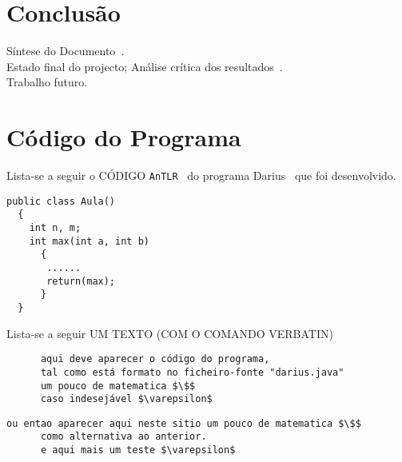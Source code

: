 \documentclass[11pt,a4paper]{report}%
\def\darius{\textsf{Darius}\xspace}
\def\antlr{\texttt{AnTLR}\xspace}
\begin{document}

\chapter{Conclusão} \label{concl}
Síntese do Documento~\cite{araujo:2018,martini:2018}.\\
Estado final do projecto; Análise crítica dos resultados~\cite{Sto77a}.\\
Trabalho futuro.

\appendix %
\chapter{Código do Programa}

Lista-se a seguir o CÓDIGO \antlr~\cite{antlr:2016} do programa
\darius~\cite{maskin:1985} que foi desenvolvido.
\begin{verbatim}
public class Aula()
  {
    int n, m;
    int max(int a, int b)
      {
       ......
       return(max);
      }
  }
\end{verbatim}

Lista-se a seguir UM TEXTO (COM O COMANDO VERBATIN)
\begin{verbatim}
      aqui deve aparecer o código do programa,
      tal como está formato no ficheiro-fonte "darius.java"
      um pouco de matematica $\$$
      caso indesejável $\varepsilon$
\end{verbatim}

\begin{lstlisting}[caption={Exemplo de uma Listagem}, label={lstExe1}]
      ou entao aparecer aqui neste sitio um pouco de matematica $\$$
      como alternativa ao anterior.
      e aqui mais um teste $\varepsilon$
\end{lstlisting}

\newpage



\end{document}
